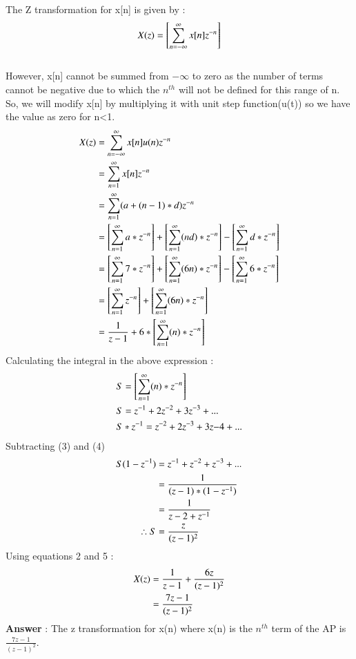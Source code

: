 \documentclass[journal,12pt,twocolumn]{IEEEtran}
\theoremstyle{remark}
\begin{document}
The Z transformation for x[n] is given by : \\
\begin{align}
X(z) =\left[ \sum_{n=-\infty}^{\infty}x[n]z^{-n}\right]\notag
\end{align}
\\
However, x[n] cannot be summed from $-\infty$ to zero as the number of terms cannot be negative due to which the $n^{th}$ will not be defined for this range of n.\\
So, we will modify x[n] by multiplying it with unit step function(u(t)) so we have the value as zero for n<1.
\begin{align}
X(z) &= \sum_{n=-\infty}^{\infty}x[n] u(n) z^{-n} \\
 &= \sum_{n=1}^{\infty}x[n]z^{-n}\notag\\
 &= \sum_{n=1}^{\infty}(a+(n-1)*d)z^{-n} \notag\\
 &=  \left[\sum_{n=1}^{\infty}a*z^{-n} \right] + \left[ \sum_{n=1}^{\infty}(nd)*z^{-n} \right] - \left[ \sum_{n=1}^{\infty}d*z^{-n} \right]\notag\\
 &=  \left[\sum_{n=1}^{\infty}7*z^{-n} \right] + \left[ \sum_{n=1}^{\infty}(6n)*z^{-n} \right] - \left[ \sum_{n=1}^{\infty}6*z^{-n} \right]\notag\\
 &=  \left[\sum_{n=1}^{\infty}z^{-n} \right] + \left[ \sum_{n=1}^{\infty}(6n)*z^{-n} \right]\notag\\
 &= \frac{1}{z-1} + 6*\left[ \sum_{n=1}^{\infty}(n)*z^{-n} \right]
\end{align}
Calculating the integral in the above expression :\\
\begin{align}
&S =  \left[\sum_{n=1}^{\infty}(n)*z^{-n}\right ]\notag\\ 
&S = z^{-1} + 2z^{-2} + 3z^{-3} + ...\\
&S*z^{-1} = z^{-2} + 2z^{-3} + 3z{-4} + ... 
\end{align}
Subtracting (3) and (4) \\
\begin{align}
S(1-z^{-1}) &= z^{-1} + z^{-2} + z^{-3} + ... \notag\\
 &= \frac{1}{(z-1)*(1-z^{-1})}\notag\\
 &= \frac{1}{z-2+z^{-1}}\notag\\
\therefore S &= \frac{z}{(z-1)^2}
\end{align}
Using equations 2 and 5 :\\
\begin{align}
X(z) &= \frac{1}{z-1} + \frac{6z}{(z-1)^2}\notag\\
 &= \frac{7z-1}{(z-1)^2}\notag
\end{align}
\large\textbf{Answer} : \normalsize The z transformation for x(n) where x(n) is the $n^{th}$ term of the AP is $\frac{7z-1}{(z-1)^2}$.
\vspace{4mm}
\end{document}
